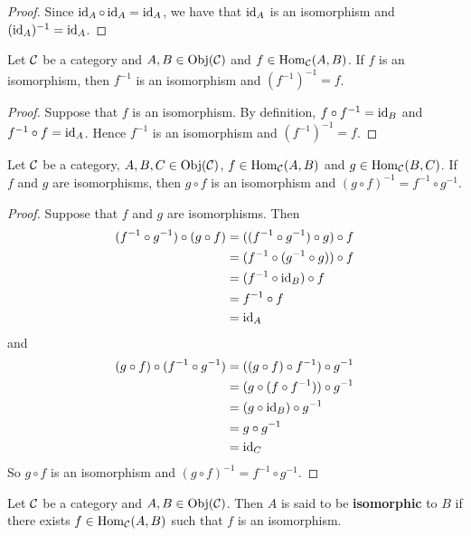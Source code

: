 \documentclass{book}
\begin{document}
	\begin{proof}
		Since $\operatorname{id}_A \circ \operatorname{id}_A = \operatorname{id}_A$, we have that $\operatorname{id}_A$ is an isomorphism and $(\operatorname{id}_A)^{-1} = \operatorname{id}_A$.
	\end{proof}
	
	\begin{ex} 
		Let $\mathcal{C}$ be a category and $A, B \in \operatorname{Obj}(\mathcal{C})$ and $f \in \operatorname{Hom}_{\mathcal{C}}(A,B)$. If $f$ is an isomorphism, then $f^{-1}$ is an isomorphism and $(f^{-1})^{-1} = f$.
	\end{ex}
	
	\begin{proof}
		Suppose that $f$ is an isomorphism. By definition, $f \circ f^{-1} = \operatorname{id}_{B}$ and $f^{-1} \circ f = \operatorname{id}_A$. Hence $f^{-1}$ is an isomorphism and $(f^{-1})^{-1} = f$.
	\end{proof}
	
	\begin{ex} 
		Let $\mathcal{C}$ be a category, $A,B,C \in \operatorname{Obj}(\mathcal{C})$, $f \in \operatorname{Hom}_{\mathcal{C}}(A, B)$ and $g \in \operatorname{Hom}_{\mathcal{C}}(B, C)$. If $f$ and $g$ are isomorphisms, then $g \circ f$ is an isomorphism and $(g \circ f)^{-1} = f^{-1} \circ g^{-1}$. 
	\end{ex}
	
	\begin{proof}
		Suppose that $f$ and $g$ are isomorphisms. Then 
		\begin{align*}
			(f^{-1} \circ g^{-1}) \circ (g \circ f) 
			& = ((f^{-1} \circ g^{-1}) \circ g) \circ f \\
			& = (f^{-1} \circ (g^{-1} \circ g)) \circ f \\
			& = (f^{-1} \circ \operatorname{id}_B) \circ f \\
			& = f^{-1} \circ f \\
			& = \operatorname{id}_{A}
		\end{align*}
		and 
		\begin{align*}
			(g \circ f) \circ (f^{-1} \circ g^{-1}) 
			& = ((g \circ f) \circ f^{-1}) \circ g^{-1} \\
			& = (g \circ (f \circ f^{-1})) \circ g^{-1} \\
			& = (g \circ \operatorname{id}_{B}) \circ g^{-1} \\
			& = g \circ  g^{-1} \\
			& = \operatorname{id}_{C}
		\end{align*}
		So $g \circ f$ is an isomorphism and $(g \circ f)^{-1} = f^{-1} \circ g^{-1}$.
	\end{proof}
	
	\begin{defn} 
		Let $\mathcal{C}$ be a category and $A,B \in \operatorname{Obj}(\mathcal{C})$. Then $A$ is said to be \textbf{isomorphic} to $B$ if there exists $f \in \operatorname{Hom}_{\mathcal{C}}(A, B)$ such that $f$ is an isomorphism. 
	\end{defn}
	
\end{document}
